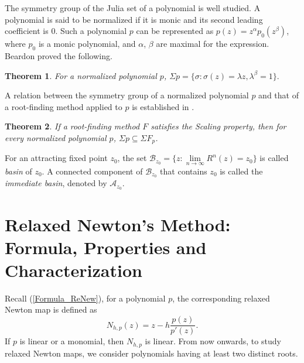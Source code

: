 \documentclass[12pt]{article}
\newtheorem{thm}{Theorem}[section]
\numberwithin{equation}{section}
\begin{document}
The symmetry group of the Julia set of a polynomial is well studied. A polynomial is said to be normalized if it is monic and its second leading coefficient is $0$. Such a polynomial $p$ can be represented as $p(z)=z^\alpha p_0(z^\beta)$, where $p_0$ is a monic polynomial, and $\alpha$, $\beta$ are maximal for the expression. Beardon proved the following.
\begin{thm}{\cite[Theorem 9.5.4]{Beardon_book}}\label{poly-symm}
	For a normalized polynomial $p$,
	$\Sigma p=\{\sigma: \sigma(z)=\lambda z, \lambda^\beta=1\}.$ 
\end{thm}

A relation between the symmetry group of a normalized polynomial $p$ and that of a root-finding method applied to $p$ is established in \cite{Sym_dyn}.
\begin{thm}{\cite[Theorem 1.1]{Sym_dyn}}\label{rel_sym}
	If a root-finding method $F$ satisfies the Scaling property, then for every normalized polynomial $p$, $\Sigma p\subseteq \Sigma F_p$.
\end{thm}

For an attracting fixed point $z_0$, the set $\mathcal{B}_{z_0}=\{z:\lim\limits_{n\to \infty}R^n(z)=z_0\}$ is called \textit{basin} of $z_0$. A connected component of $\mathcal{B}_{z_0}$ that contains $z_0$ is called the \textit{immediate basin}, denoted by $\mathcal{A}_{z_0}$.
\section{Relaxed Newton's Method: Formula, Properties and Characterization}\label{Sec_RNM}
Recall (\ref{Formula_ReNew}), for a polynomial $p$, the corresponding relaxed Newton map is defined as
$$N_{h, p}(z)=z-h \frac{p(z)}{p'(z)}.$$ 
If $p$ is linear or a monomial, then $N_{h, p}$ is linear. From now onwards, to study relaxed Newton maps, we consider polynomials having at least two distinct roots.
\end{document}
